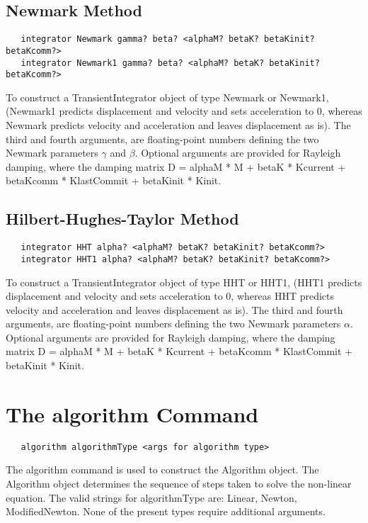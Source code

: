 \documentclass[12pt]{article}
\begin{document}
\subsection{Newmark Method}

{\sf\small
\begin{verbatim}
   integrator Newmark gamma? beta? <alphaM? betaK? betaKinit? betaKcomm?> 
   integrator Newmark1 gamma? beta? <alphaM? betaK? betaKinit? betaKcomm?> 
\end{verbatim}
}

To construct a TransientIntegrator object of type Newmark or Newmark1,
(Newmark1 predicts displacement and velocity and sets acceleration to
$0$, whereas Newmark predicts velocity and acceleration and leaves
displacement as is). The third and fourth arguments, are
floating-point numbers defining the two Newmark parameters $\gamma$ and
$\beta$. Optional arguments are provided for Rayleigh damping, where
the damping matrix D = alphaM * M + betaK * Kcurrent + betaKcomm *
KlastCommit + betaKinit * Kinit.

\subsection{Hilbert-Hughes-Taylor Method}

{\sf\small
\begin{verbatim}
   integrator HHT alpha? <alphaM? betaK? betaKinit? betaKcomm?> 
   integrator HHT1 alpha? <alphaM? betaK? betaKinit? betaKcomm?> 
\end{verbatim}
}

To construct a TransientIntegrator object of type HHT or HHT1,
(HHT1 predicts displacement and velocity and sets acceleration to
$0$, whereas HHT predicts velocity and acceleration and leaves
displacement as is). The third and fourth arguments, are
floating-point numbers defining the two Newmark parameters
$\alpha$. Optional arguments are provided for Rayleigh damping, where
the damping matrix D = alphaM * M + betaK * Kcurrent + betaKcomm *
KlastCommit + betaKinit * Kinit.

\section {The algorithm Command}
{\sf\small
\begin{verbatim}
   algorithm algorithmType <args for algorithm type>
\end{verbatim}
}

The algorithm command is used to construct the Algorithm
object. The Algorithm object determines the sequence of steps taken
to solve the non-linear equation. The valid strings for algorithmType
are: Linear, Newton, ModifiedNewton. None of the present types
require additional arguments.
\end{document}

